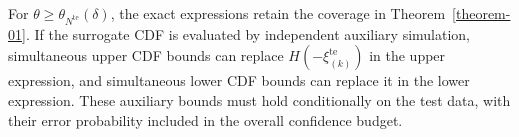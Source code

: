 \documentclass[review,11pt,3p,authoryear,nopreprintline]{elsarticle}
\begin{document}
For $\theta\ge\theta_{N^{\mathrm{te}}}(\delta)$, the exact expressions retain the coverage in Theorem~\ref{theorem-01}. If the surrogate CDF is evaluated by independent auxiliary simulation, simultaneous upper CDF bounds can replace $H\left(-\xi_{(k)}^{\mathrm{te}}\right)$ in the upper expression, and simultaneous lower CDF bounds can replace it in the lower expression. These auxiliary bounds must hold conditionally on the test data, with their error probability included in the overall confidence budget.


%
%
\end{document}
